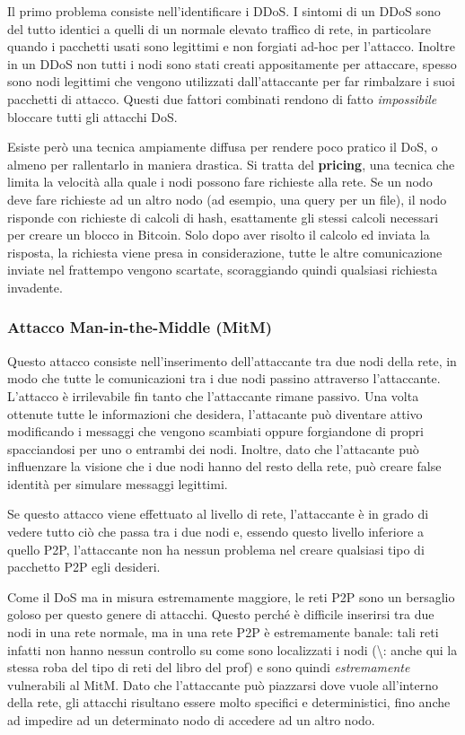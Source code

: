 Il primo problema consiste nell'identificare i DDoS. I sintomi di un DDoS sono del tutto identici a quelli di un normale elevato traffico di rete, in particolare quando i pacchetti usati sono legittimi e non forgiati ad-hoc per l'attacco. Inoltre in un DDoS non tutti i nodi sono stati creati appositamente per attaccare, spesso sono nodi legittimi che vengono utilizzati dall'attaccante per far rimbalzare i suoi pacchetti di attacco. Questi due fattori combinati rendono di fatto \emph{impossibile} bloccare tutti gli attacchi DoS.

Esiste però una tecnica ampiamente diffusa per rendere poco pratico il DoS, o almeno per rallentarlo in maniera drastica. Si tratta del \textbf{pricing}, una tecnica che limita la velocità alla quale i nodi possono fare richieste alla rete. Se un nodo deve fare richieste ad un altro nodo (ad esempio, una query per un file), il nodo risponde con richieste di calcoli di hash, esattamente gli stessi calcoli necessari per creare un blocco in Bitcoin. Solo dopo aver risolto il calcolo ed inviata la risposta, la richiesta viene presa in considerazione, tutte le altre comunicazione inviate nel frattempo vengono scartate, scoraggiando quindi qualsiasi richiesta invadente.

\subsubsection{Attacco Man-in-the-Middle (MitM)}\label{attacco-man-in-the-middle-mitm}

Questo attacco consiste nell'inserimento dell'attaccante tra due nodi della rete, in modo che tutte le comunicazioni tra i due nodi passino attraverso l'attaccante. L'attacco è irrilevabile fin tanto che l'attaccante rimane passivo. Una volta ottenute tutte le informazioni che desidera, l'attacante può diventare attivo modificando i messaggi che vengono scambiati oppure forgiandone di propri spacciandosi per uno o entrambi dei nodi. Inoltre, dato che l'attacante può influenzare la visione che i due nodi hanno del resto della rete, può creare false identità per simulare messaggi legittimi.

Se questo attacco viene effettuato al livello di rete, l'attaccante è in grado di vedere tutto ciò che passa tra i due nodi e, essendo questo livello inferiore a quello P2P, l'attaccante non ha nessun problema nel creare qualsiasi tipo di pacchetto P2P egli desideri.

Come il DoS ma in misura estremamente maggiore, le reti P2P sono un bersaglio goloso per questo genere di attacchi. Questo perché è difficile inserirsi tra due nodi in una rete normale, ma in una rete P2P è estremamente banale: tali reti infatti non hanno nessun controllo su come sono localizzati i nodi (\textbackslash{}\TODO: anche qui la stessa roba del tipo di reti del libro del prof) e sono quindi \emph{estremamente} vulnerabili al MitM. Dato che l'attaccante può piazzarsi dove vuole all'interno della rete, gli attacchi risultano essere molto specifici e deterministici, fino anche ad impedire ad un determinato nodo di accedere ad un altro nodo.

